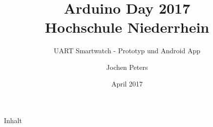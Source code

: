 \documentclass{beamer}
\title{Arduino Day 2017\\ Hochschule Niederrhein}
\subtitle{UART Smartwatch - Prototyp und Android App}
\author{Jochen Peters}
\institute{http://dummer.click}
\date{April 2017}
\makeatletter
\def\maxwidth{\ifdim\Gin@nat@width>\linewidth\linewidth
\else\Gin@nat@width\fi}
\makeatother
\begin{document}

	\begin{frame}
		\titlepage
	\end{frame}

	\begin{frame}{Inhalt}
		\tableofcontents
	\end{frame}

	\makeatother
	\let\Oldincludegraphics\includegraphics
	\renewcommand{\includegraphics}[1]{\Oldincludegraphics[width=\maxwidth]{#1}}


\end{document}
